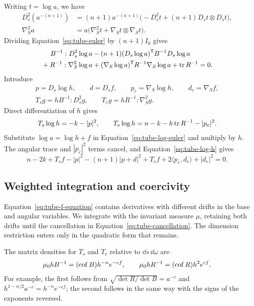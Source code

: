 Writing $t=\log a$, we have
\[
 \begin{split}
 D_s^2(a^{-(n+1)})
   &=(n+1)a^{-(n+1)}
     \bigl(-D_s^2t+(n+1)D_st\otimes D_st\bigr),\\
 \nabla_S^2a&=a\bigl(\nabla_S^2t+
                        \nabla_St\otimes\nabla_St\bigr).
 \end{split}
\]
Dividing Equation~\eqref{eq:tube-euler} by $(n+1)I_0$ gives
\begin{equation}\label{eq:tube-log-euler}
 \begin{split}
 B^{-1}:D_s^2\log a
 &-(n+1)(D_s\log a)^{\mathsf T}B^{-1}D_s\log a\\
 {}+R^{-1}:\nabla_S^2\log a
 &+(\nabla_S\log a)^{\mathsf T}R^{-1}\nabla_S\log a
 +\operatorname{tr} R^{-1}=0.
 \end{split}
\end{equation}
Introduce
\[
 \begin{gathered}
 p=D_s\log h,\qquad d=D_sf,
 \qquad p_e=\nabla_S\log h,\qquad d_e=\nabla_Sf,\\
 T_sg=hB^{-1}:D_s^2g,
 \qquad T_eg=hR^{-1}:\nabla_S^2g.
 \end{gathered}
\]
Direct differentiation of $h$ gives
\begin{equation}\label{eq:tube-log-h}
 T_s\log h=-k-|p|^2,
 \qquad
 T_e\log h=n-k-h\operatorname{tr} R^{-1}-|p_e|^2.
\end{equation}
Substitute $\log a=\log h+f$ in
Equation~\eqref{eq:tube-log-euler} and multiply by $h$.  The angular
trace and $|p_e|^2$ terms cancel, and
Equation~\eqref{eq:tube-log-h} gives
\begin{equation}\label{eq:tube-f-equation}
 n-2k+T_sf-|p|^2-(n+1)|p+d|^2
 +T_ef+2\langle p_e,d_e\rangle+|d_e|^2=0.
\end{equation}

\subsection{Weighted integration and coercivity}

Equation~\eqref{eq:tube-f-equation} contains derivatives with different
drifts in the base and angular variables. We integrate with the
invariant measure $\mu$, retaining both drifts until the cancellation
in Equation~\eqref{eq:tube-cancellation}. The dimension restriction
enters only in the quadratic form that remains.

The matrix densities for $T_s$ and $T_e$ relative to
$\dd s\,\dd\omega$ are
\begin{equation}\label{eq:tube-matrix-densities}
 \mu_0hB^{-1}=(\operatorname{cof} B)h^{-n}e^{-cf},
 \qquad
 \mu_0hR^{-1}=(\operatorname{cof} R)h^2e^{cf}.
\end{equation}
For example, the first follows from
$\sqrt{\det R/\det B}=a^{-c}$ and
$h^{1-n/2}a^{-c}=h^{-n}e^{-cf}$; the second follows in the same way
with the signs of the exponents reversed.

